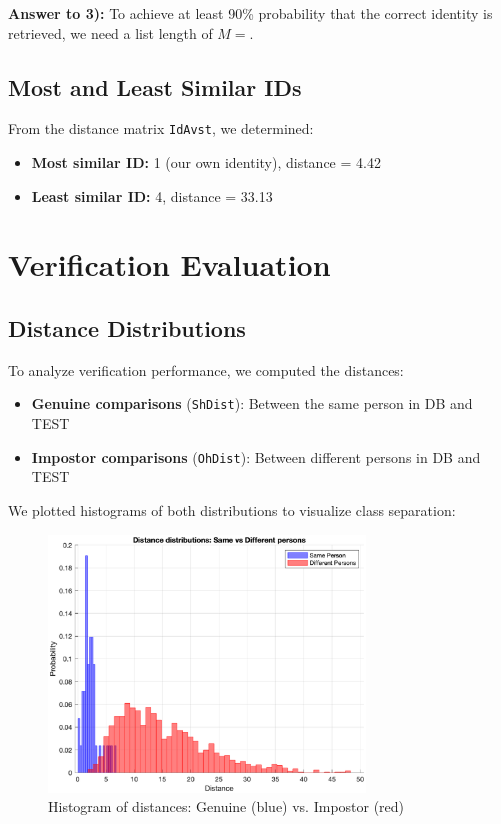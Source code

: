 \documentclass[a4paper,11pt]{article}
\begin{document}
\vspace{0.5em}
\noindent\textbf{Answer to 3):} To achieve at least 90\% probability that the correct identity is retrieved, we need a list length of $M=$.

\subsection{Most and Least Similar IDs}
From the distance matrix \texttt{IdAvst}, we determined:
\begin{itemize}[noitemsep]
    \item \textbf{Most similar ID:} 1 (our own identity), distance = 4.42
    \item \textbf{Least similar ID:} 4, distance = 33.13
\end{itemize}

\section{Verification Evaluation}

\subsection{Distance Distributions}
To analyze verification performance, we computed the distances:
\begin{itemize}[noitemsep]
    \item \textbf{Genuine comparisons} (\texttt{ShDist}): Between the same person in DB and TEST
    \item \textbf{Impostor comparisons} (\texttt{OhDist}): Between different persons in DB and TEST
\end{itemize}

We plotted histograms of both distributions to visualize class separation:

\begin{figure}[H]
    \centering
    \includegraphics[width=0.75\textwidth]{figures/histograms.eps}
    \caption{Histogram of distances: Genuine (blue) vs. Impostor (red)}
    \label{fig:histograms}
\end{figure}
\end{document}
